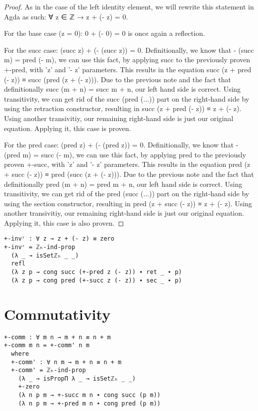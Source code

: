 \begin{proof}
  As in the case of the left identity element, we will rewrite this statement in Agda as such: ∀ z ∈ ℤ → z + (- z) = 0.

  For the base case (z = 0): 0 + (- 0) = 0 is once again a reflection.

  For the succ case: (succ z) + (- (succ z)) = 0. Definitionally, we know that - (succ m) = pred (- m), we can use this fact, by applying succ to the previously proven +-pred, with 'z' and '- z' parameters. This results in the equation succ (z + pred (- z)) ≡ succ (pred (z + (- z))). Due to the previous note and the fact that definitionally succ (m + n) = succ m + n, our left hand side is correct. Using transitivity, we can get rid of the succ (pred (...)) part on the right-hand side by using the retraction constructor, resulting in succ (z + pred (- z)) ≡ z + (- z). Using another transivitiy, our remaining right-hand side is just our original equation. Applying it, this case is proven.

  For the pred case: (pred z) + (- (pred z)) = 0. Definitionally, we know that - (pred m) = succ (- m), we can use this fact, by applying pred to the previously proven +-succ, with 'z' and '- z' parameters. This results in the equation pred (z + succ (- z)) ≡ pred (succ (z + (- z))). Due to the previous note and the fact that definitionally pred (m + n) = pred m + n, our left hand side is correct. Using transitivity, we can get rid of the pred (succ (...)) part on the right-hand side by using the section constructor, resulting in pred (z + succ (- z)) ≡ z + (- z). Using another transivitiy, our remaining right-hand side is just our original equation. Applying it, this case is also proven.
\end{proof}

\begin{listing}[H]
\begin{verbatim}
+-invʳ : ∀ z → z + (- z) ≡ zero
+-invʳ = ℤₕ-ind-prop
  (λ _ → isSetℤₕ _ _)
  refl
  (λ z p → cong succ (+-pred z (- z)) ∙ ret _ ∙ p)
  (λ z p → cong pred (+-succ z (- z)) ∙ sec _ ∙ p)
\end{verbatim}
\caption{Agda proof of addition having a right inverse element}
\end{listing}

\section{Commutativity}
\begin{verbatim}
+-comm : ∀ m n → m + n ≡ n + m
+-comm m n = +-comm' n m
  where
  +-comm' : ∀ n m → m + n ≡ n + m
  +-comm' = ℤₕ-ind-prop
    (λ _ → isPropΠ λ _ → isSetℤₕ _ _)
    +-zero
    (λ n p m → +-succ m n ∙ cong succ (p m))
    (λ n p m → +-pred m n ∙ cong pred (p m))
\end{verbatim}
